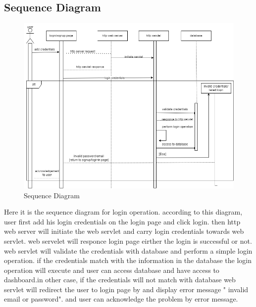\subsection{Sequence Diagram}

\begin{figure}[h]
    \centering
    \includegraphics[width=1\textwidth]{images/SD.png}
    \caption{Sequence Diagram}
    \label{FBPM}
\end{figure}

Here it is the sequence diagram for login operation. according to this diagram, user first add his login credentials on the login page and click login. then http web server will initiate the web servlet and carry login credentials towards web servlet. web servelet will responce login page eirther the login is successful or not. web servlet will validate the credentials with database and perform a simple login operation. if the credentials match with the information in the database the login operation will execute and user can access database and have access to dashboard.in other case, if the credentials will not match with database web servlet will redirect the user to login page by and display error message " invalid email or password". and user can acknowledge the problem by error message.